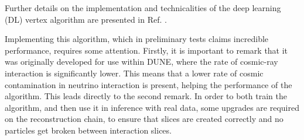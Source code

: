 Further details on the implementation and technicalities of the deep learning (DL) vertex algorithm are presented in Ref. \cite{DUNE:2025wti}. 

Implementing this algorithm, which in preliminary tests claims incredible performance, requires some attention. Firstly, it is important to remark that it was originally developed for use within DUNE, where the rate of cosmic-ray interaction is significantly lower. This means that a lower rate of cosmic contamination in neutrino interaction is present, helping the performance of the algorithm. This leads directly to the second remark. In order to both train the algorithm, and then use it in inference with real data, some upgrades are required on the reconstruction chain, to ensure that slices are created correctly and no particles get broken between interaction slices. 

% 

